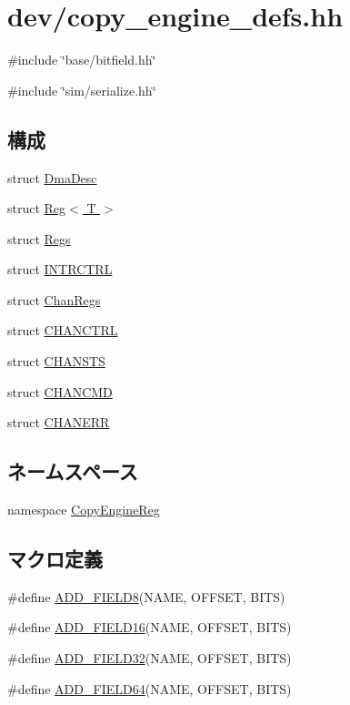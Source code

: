 \hypertarget{copy__engine__defs_8hh}{
\section{dev/copy\_\-engine\_\-defs.hh}
\label{copy__engine__defs_8hh}
}
{\ttfamily \#include \char`\"{}base/bitfield.hh\char`\"{}}\par
{\ttfamily \#include \char`\"{}sim/serialize.hh\char`\"{}}\par
\subsection*{構成}
\begin{DoxyCompactItemize}
\item 
struct \hyperlink{structCopyEngineReg_1_1DmaDesc}{DmaDesc}
\item 
struct \hyperlink{structCopyEngineReg_1_1Reg}{Reg$<$ T $>$}
\item 
struct \hyperlink{structCopyEngineReg_1_1Regs}{Regs}
\item 
struct \hyperlink{structCopyEngineReg_1_1Regs_1_1INTRCTRL}{INTRCTRL}
\item 
struct \hyperlink{structCopyEngineReg_1_1ChanRegs}{ChanRegs}
\item 
struct \hyperlink{structCopyEngineReg_1_1ChanRegs_1_1CHANCTRL}{CHANCTRL}
\item 
struct \hyperlink{structCopyEngineReg_1_1ChanRegs_1_1CHANSTS}{CHANSTS}
\item 
struct \hyperlink{structCopyEngineReg_1_1ChanRegs_1_1CHANCMD}{CHANCMD}
\item 
struct \hyperlink{structCopyEngineReg_1_1ChanRegs_1_1CHANERR}{CHANERR}
\end{DoxyCompactItemize}
\subsection*{ネームスペース}
\begin{DoxyCompactItemize}
\item 
namespace \hyperlink{namespaceCopyEngineReg}{CopyEngineReg}
\end{DoxyCompactItemize}
\subsection*{マクロ定義}
\begin{DoxyCompactItemize}
\item 
\#define \hyperlink{copy__engine__defs_8hh_ae16234c02c4e076461892d174dde5373}{ADD\_\-FIELD8}(NAME, OFFSET, BITS)
\item 
\#define \hyperlink{copy__engine__defs_8hh_a760e35ca06a1a50a7ed0d27df6b8376c}{ADD\_\-FIELD16}(NAME, OFFSET, BITS)
\item 
\#define \hyperlink{copy__engine__defs_8hh_a7a3144e348db866b82200668c4a308d0}{ADD\_\-FIELD32}(NAME, OFFSET, BITS)
\item 
\#define \hyperlink{copy__engine__defs_8hh_adbdb4bcfd1b192160a725f18d78eb920}{ADD\_\-FIELD64}(NAME, OFFSET, BITS)
\end{DoxyCompactItemize}
